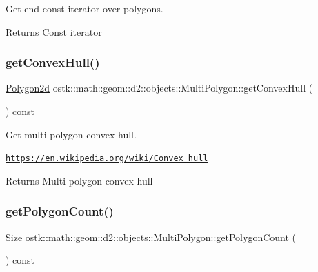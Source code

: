 Get end const iterator over polygons. 

\begin{DoxyReturn}{Returns}
Const iterator 
\end{DoxyReturn}
\mbox{\label{classostk_1_1math_1_1geom_1_1d2_1_1objects_1_1_multi_polygon_af73cf685c2fec86bbbe0aa2ee20a5e64}} 
\subsubsection{\texorpdfstring{get\+Convex\+Hull()}{getConvexHull()}}
{\footnotesize\ttfamily \hyperlink{namespaceostk_1_1math_1_1geom_1_1d2_1_1objects_a5786a3021d23f9c64937e263a2da9d27}{Polygon2d} ostk\+::math\+::geom\+::d2\+::objects\+::\+Multi\+Polygon\+::get\+Convex\+Hull (\begin{DoxyParamCaption}{ }\end{DoxyParamCaption}) const}



Get multi-\/polygon convex hull. 

\href{https://en.wikipedia.org/wiki/Convex_hull}{\tt https\+://en.\+wikipedia.\+org/wiki/\+Convex\+\_\+hull}

\begin{DoxyReturn}{Returns}
Multi-\/polygon convex hull 
\end{DoxyReturn}
\mbox{\label{classostk_1_1math_1_1geom_1_1d2_1_1objects_1_1_multi_polygon_a52386a4ee9cf5fa92cb42e9d4ba3fd93}} 
\subsubsection{\texorpdfstring{get\+Polygon\+Count()}{getPolygonCount()}}
{\footnotesize\ttfamily Size ostk\+::math\+::geom\+::d2\+::objects\+::\+Multi\+Polygon\+::get\+Polygon\+Count (\begin{DoxyParamCaption}{ }\end{DoxyParamCaption}) const}



